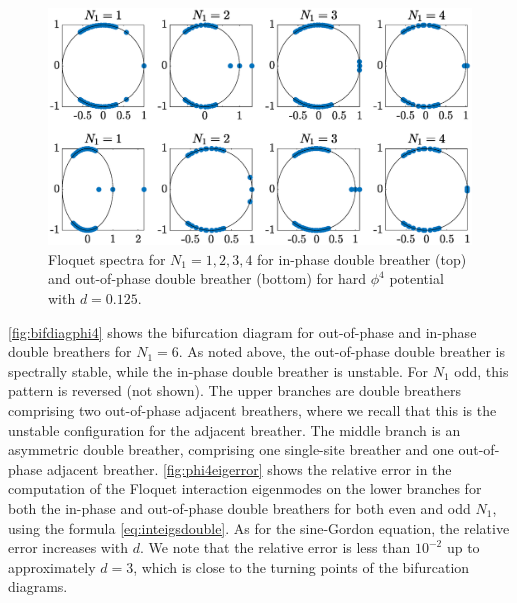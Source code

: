\documentclass[12pt,reqno]{amsart}
\theoremstyle{definition}
\begin{document}
\begin{figure}
	\includegraphics[width=15cm]{phi4hardfloqplot.eps}
	\caption{Floquet spectra for $N_1 = 1, 2, 3, 4$ for in-phase double breather (top) and out-of-phase double breather (bottom) for hard $\phi^4$ potential with $d = 0.125$.}
	\label{fig:phi4hardfloqplot}
\end{figure}

\cref{fig:bifdiagphi4} shows the bifurcation diagram for out-of-phase and in-phase double breathers for $N_1 = 6$. As noted above, the out-of-phase double breather is spectrally stable, while the in-phase double breather is unstable. For $N_1$ odd, this pattern is reversed (not shown). The upper branches are double breathers comprising two out-of-phase adjacent breathers, where we recall that this is the unstable configuration for the adjacent breather. The middle branch is an asymmetric double breather, comprising one single-site breather and one out-of-phase adjacent breather. \cref{fig:phi4eigerror} shows the relative error in the computation of the Floquet interaction eigenmodes on the lower branches for both the in-phase and out-of-phase double breathers for both even and odd $N_1$, using the formula \cref{eq:inteigsdouble}. As for the sine-Gordon equation, the relative error increases with $d$. We note that the relative error is less than $10^{-2}$ up to approximately $d = 3$, which is close to the turning points of the bifurcation diagrams. 
\end{document}
